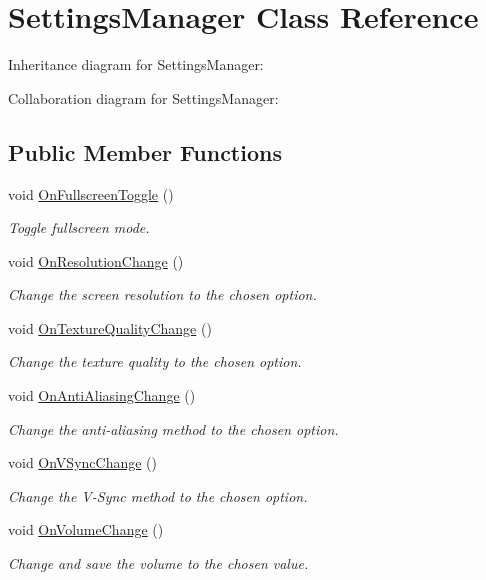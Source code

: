 \hypertarget{class_settings_manager}{}\section{Settings\+Manager Class Reference}
\label{class_settings_manager}


Inheritance diagram for Settings\+Manager\+:


Collaboration diagram for Settings\+Manager\+:
\subsection*{Public Member Functions}
\begin{DoxyCompactItemize}
\item 
void \mbox{\hyperlink{class_settings_manager_ac690ec7be2f8760959c819ff5235fa60}{On\+Fullscreen\+Toggle}} ()
\begin{DoxyCompactList}\small\item\em Toggle fullscreen mode. \end{DoxyCompactList}\item 
void \mbox{\hyperlink{class_settings_manager_a4b9cc3fc84f2c5b2a5f79010a71ddf44}{On\+Resolution\+Change}} ()
\begin{DoxyCompactList}\small\item\em Change the screen resolution to the chosen option. \end{DoxyCompactList}\item 
void \mbox{\hyperlink{class_settings_manager_ac64e635b27333995bccd8cdd01e66471}{On\+Texture\+Quality\+Change}} ()
\begin{DoxyCompactList}\small\item\em Change the texture quality to the chosen option. \end{DoxyCompactList}\item 
void \mbox{\hyperlink{class_settings_manager_a9098e096f294c8289f888d1cef3d88e8}{On\+Anti\+Aliasing\+Change}} ()
\begin{DoxyCompactList}\small\item\em Change the anti-\/aliasing method to the chosen option. \end{DoxyCompactList}\item 
void \mbox{\hyperlink{class_settings_manager_aba04234da5db424bda53e733270e8d35}{On\+V\+Sync\+Change}} ()
\begin{DoxyCompactList}\small\item\em Change the V-\/\+Sync method to the chosen option. \end{DoxyCompactList}\item 
void \mbox{\hyperlink{class_settings_manager_a6d25a3155a5df19d54cfd1cb166fb4f7}{On\+Volume\+Change}} ()
\begin{DoxyCompactList}\small\item\em Change and save the volume to the chosen value. \end{DoxyCompactList}\end{DoxyCompactItemize}
